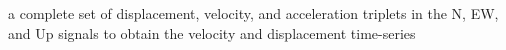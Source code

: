 a complete set of displacement, velocity, and acceleration triplets in the N, EW, and Up 
signals to obtain the velocity and displacement time-series














